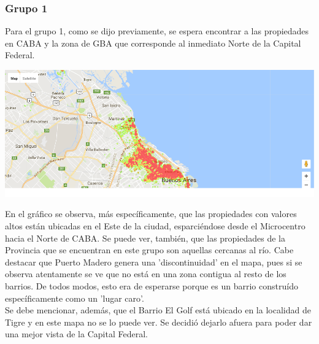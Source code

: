 \documentclass[a4paper, 10pt]{article}
\newcommand\tab[1][0.5cm]{\hspace*{#1}}
\begin{document}
				\subsubsection{Grupo 1}
					Para el grupo 1, como se dijo previamente, se espera encontrar a las propiedades en CABA y la zona de GBA
					que corresponde al inmediato Norte de la Capital Federal.
					\begin{center}
						\includegraphics[width=\textwidth]{images/m2Group1HeatMap}
				  	\end{center}
				  	\tab En el gráfico se observa, más específicamente, que las propiedades con valores altos están ubicadas
				  	en el Este de la ciudad, esparciéndose desde el Microcentro hacia el Norte de CABA. Se puede ver, también,
				  	que las propiedades de la Provincia que se encuentran en este grupo son aquellas cercanas al río. Cabe destacar
				  	que Puerto Madero genera una 'discontinuidad' en el mapa, pues si se observa atentamente se ve que no está en
				  	una zona contigua al resto de los barrios. De todos modos, esto era de esperarse porque es un barrio construído
				  	específicamente como un 'lugar caro'. \\
				  	\tab Se debe mencionar, además, que el Barrio El Golf está ubicado en la localidad de Tigre y en este mapa no
				  	se lo puede ver. Se decidió dejarlo afuera para poder dar una mejor vista de la Capital Federal.
\end{document}
